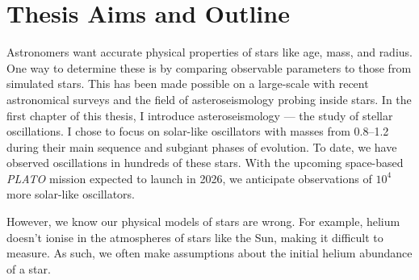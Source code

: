 \chapter{Thesis Aims and Outline}

Astronomers want accurate physical properties of stars like age, mass, and radius. One way to determine these is by comparing observable parameters to those from simulated stars. This has been made possible on a large-scale with recent astronomical surveys and the field of asteroseismology probing inside stars. In the first chapter of this thesis, I introduce asteroseismology --- the study of stellar oscillations. I chose to focus on solar-like oscillators with masses from \SIrange{0.8}{1.2}{\solarmass} during their main sequence and subgiant phases of evolution. To date, we have observed oscillations in hundreds of these stars. With the upcoming space-based \emph{PLATO} mission expected to launch in 2026, we anticipate observations of \(10^4\) more solar-like oscillators. 

However, we know our physical models of stars are wrong. For example, helium doesn't ionise in the atmospheres of stars like the Sun, making it difficult to measure. As such, we often make assumptions about the initial helium abundance of a star. 
